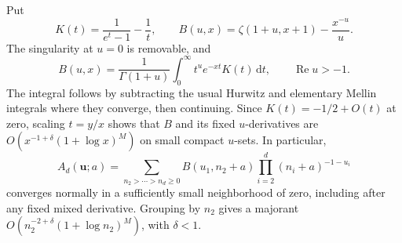 \documentclass[11pt]{article}
\numberwithin{equation}{section}
\theoremstyle{definition}
\newcommand{\dd}{\,\mathrm d}
\newcommand{\Ree}{\operatorname{Re}}
\newcommand{\bbu}{\boldsymbol u}
\begin{document}
Put
\begin{equation}\label{eq:kernel-B}
 K(t)=\frac1{e^t-1}-\frac1t,\qquad
 B(u,x)=\zeta(1+u,x+1)-\frac{x^{-u}}u.
\end{equation}
The singularity at $u=0$ is removable, and
\begin{equation}\label{eq:B-Mellin}
 B(u,x)=\frac1{\Gamma(1+u)}\int_0^\infty t^u e^{-xt}K(t)\dd t,
 \qquad \Ree u>-1.
\end{equation}
The integral follows by subtracting the usual Hurwitz and elementary
Mellin integrals where they converge, then continuing. Since
$K(t)=-1/2+O(t)$ at zero, scaling $t=y/x$ shows that $B$ and its fixed
$u$-derivatives are $O(x^{-1+\delta}(1+\log x)^M)$ on small compact
$u$-sets. In particular,
\begin{equation}\label{eq:tail-A}
 A_d(\bbu;a)=\sum_{n_2>\cdots>n_d\ge0}
 B(u_1,n_2+a)\prod_{i=2}^d(n_i+a)^{-1-u_i}
\end{equation}
converges normally in a sufficiently small neighborhood of zero, including
after any fixed mixed derivative. Grouping by $n_2$ gives a majorant
$O(n_2^{-2+\delta}(1+\log n_2)^M)$, with $\delta<1$.
\end{document}
